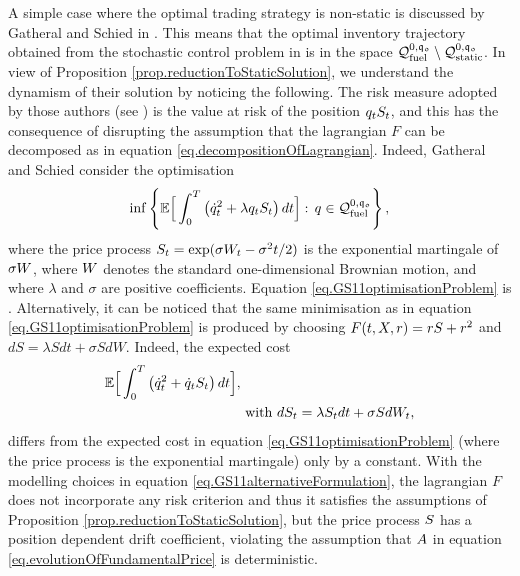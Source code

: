 \documentclass[10pt,a4paper]{article}
\begin{document}
\begin{remark}\label{remark.GS11dynamicSolution}
A simple case where the optimal trading strategy is non-static is discussed by Gatheral and Schied in \cite{GS11opt}. This means that the optimal inventory trajectory obtained from the stochastic control problem in \cite{GS11opt} is in the space $\spaceInventoryTrajectoriesFuel^{0,\initialInventory}\setminus \spaceInventoryTrajectoriesStatic^{0,\initialInventory}$.  In view of Proposition \ref{prop.reductionToStaticSolution}, we understand the dynamism of their solution by noticing the following. The risk measure adopted by those authors (see \cite[Section 2.1]{GS11opt}) is the value at risk of the position $\inventory_t \fundamentalPrice_t$, and this has the consequence of disrupting the assumption that the lagrangian $F$ can be decomposed as in equation \eqref{eq.decompositionOfLagrangian}. Indeed, Gatheral and Schied consider the optimisation 
\begin{equation}\label{eq.GS11optimisationProblem}
\inf\left\lbrace
\Expectation \Big[
\int_{0}^{\timeHorizon} \left(\inventoryRate_t\squared + \lambda \inventory_t\fundamentalPrice_t\right) dt
\Big]
 : \, \inventory \in \spaceInventoryTrajectoriesFuel^{0,\initialInventory}
\right\rbrace,
\end{equation}
where the price process  $\fundamentalPrice_t = \exp(\sigma\brownianMotion_t -\sigma\squared t /2)$ is the exponential martingale of $\sigma\brownianMotion$, where $\brownianMotion$ denotes  the standard one-dimensional Brownian motion, and where $\lambda$ and $\sigma$ are positive coefficients. Equation \eqref{eq.GS11optimisationProblem} is  \cite[Equation (2.7)]{GS11opt}.
Alternatively, it can be noticed that the same minimisation as in equation \eqref{eq.GS11optimisationProblem} is produced by choosing $F(t,X,r)=rS +  r\squared$ and $dS=\lambda Sdt +\sigma SdW$. Indeed, the expected cost 
\begin{equation}\label{eq.GS11alternativeFormulation}
\begin{split}
\Expectation \Big[
\int_{0}^{\timeHorizon} \left(\inventoryRate_t\squared +   \inventoryRate_t\fundamentalPrice_t\right) dt
\Big],& \\
& \text{ with } 
d\fundamentalPrice_t = \lambda \fundamentalPrice_t dt + \sigma \fundamentalPrice d\brownianMotion_t,
\end{split}
\end{equation}
differs from the expected cost in equation  \eqref{eq.GS11optimisationProblem} (where the price process is the exponential martingale) only by a constant. With the modelling choices in equation \eqref{eq.GS11alternativeFormulation}, the lagrangian $F$ does not incorporate any risk criterion and thus it satisfies the assumptions of Proposition \ref{prop.reductionToStaticSolution}, but the price process $\fundamentalPrice$ has a position dependent drift coefficient, violating  the assumption that $\boundedVariationPart$ in equation \eqref{eq.evolutionOfFundamentalPrice} is deterministic.
\end{remark}
\end{document}

